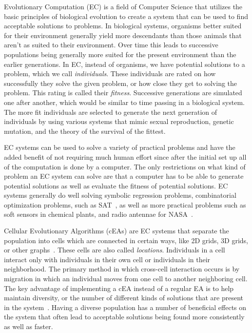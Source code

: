 \documentclass[12pt]{article}
\begin{document}
Evolutionary Computation (EC) is a field of Computer Science that utilizes the basic principles of biological evolution to create a system that can be used to find acceptable solutions to problems. In biological systems, organisms better suited for their environment generally yield more descendants than those animals that aren't as suited to their environment. Over time this leads to successive populations being generally more suited for the present environment than the earlier generations. In EC, instead of organisms, we have potential solutions to a problem, which we call \emph{individuals}. These individuals are rated on how successfully they solve the given problem, or how close they get to solving the problem. This rating is called their \emph{fitness}. Successive generations are simulated one after another, which would be similar to time passing in a biological system. The more fit individuals are selected to generate the next generation of individuals by using various systems that mimic sexual reproduction, genetic mutation, and the theory of the survival of the fittest.

EC systems can be used to solve a variety of practical problems and have the added benefit of not requiring much human effort since after the initial set up all of the computation is done by a computer. The only restrictions on what kind of problem an EC system can solve are that a computer has to be able to generate potential solutions as well as evaluate the fitness of potential solutions. EC systems generally do well solving symbolic regression problems, combinatorial optimization problems, such as SAT~\cite{Gottlieb:2002:EAS:638548.638550}, as well as more practical problems such as soft sensors in chemical plants, and radio antennae for NASA~\cite{poli08:fieldguide}.

Cellular Evolutionary Algorithms (cEAs) are EC systems that separate the population into cells which are connected in certain ways, like 2D grids, 3D grids, or other graphs~\cite{Alba:2008}. These cells are also called \emph{locations}. Individuals in a cell interact only with individuals in their own cell or individuals in their neighborhood. The primary method in which cross-cell interaction occurs is by migration in which an individual moves from one cell to another neighboring cell. The key advantage of implementing a cEA instead of a regular EA is to help maintain diversity, or the number of different kinds of solutions that are present in the system~\cite{Alba:2008}. Having a diverse population has a number of beneficial effects on the system that often lead to acceptable solutions being found more consistently as well as faster.
\end{document}
